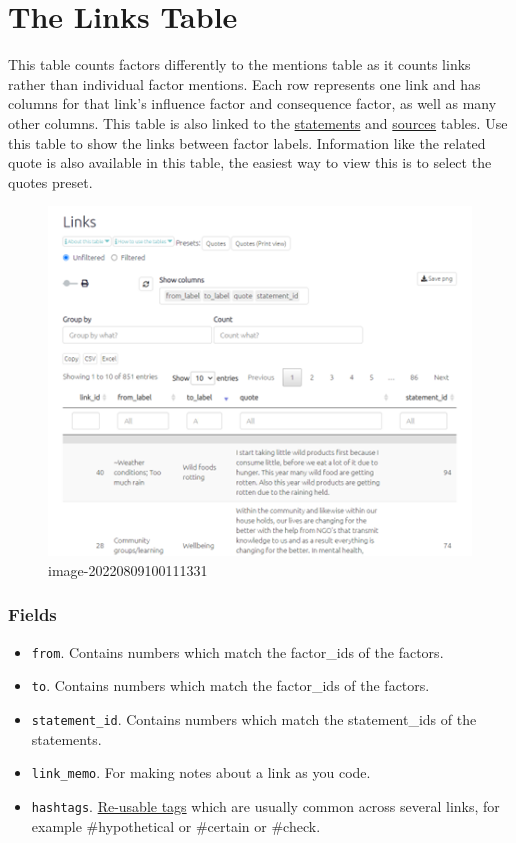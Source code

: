 \documentclass[
]{book}
\providecommand{\tightlist}{%
  \setlength{\itemsep}{0pt}\setlength{\parskip}{0pt}}
\begin{document}
\hypertarget{xthe-links-table-old}{%
\chapter{The Links Table}\label{xthe-links-table-old}}

This table counts factors differently to the mentions table as it counts links rather than individual factor mentions. Each row represents one link and has columns for that link's influence factor and consequence factor, as well as many other columns. This table is also linked to the \protect\hyperlink{xthe-statements-table-old}{statements} and \protect\hyperlink{xthe-sources-table-old}{sources} tables. Use this table to show the links between factor labels. Information like the related quote is also available in this table, the easiest way to view this is to select the quotes preset.

\begin{figure}
\centering
\includegraphics[width=6.77083in,height=\textheight]{_assets/image-20220809100111331.png}
\caption{image-20220809100111331}
\end{figure}

\hypertarget{fields}{%
\subsection{Fields}\label{fields}}

\begin{itemize}
\tightlist
\item
  \texttt{from}. Contains numbers which match the factor\_ids of the factors.
\item
  \texttt{to}. Contains numbers which match the factor\_ids of the factors.
\item
  \texttt{statement\_id}. Contains numbers which match the statement\_ids of the statements.
\item
  \texttt{link\_memo}. For making notes about a link as you code.
\item
  \texttt{hashtags}. \protect\hyperlink{xhashtags}{Re-usable tags} which are usually common across several links, for example \#hypothetical or \#certain or \#check.
\end{itemize}
\end{document}
